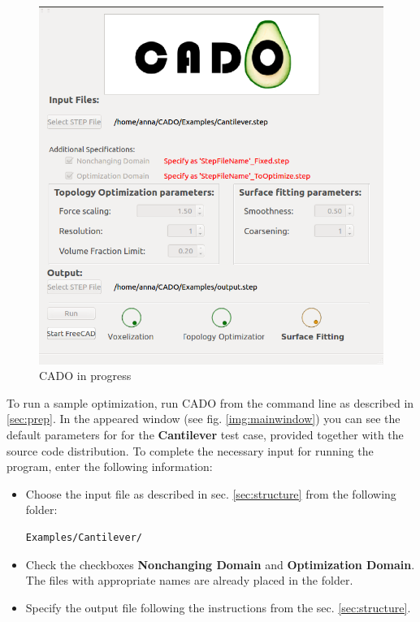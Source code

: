 \documentclass[
12pt, %
a4paper, %
oneside, %
headinclude,footinclude, %
BCOR5mm, %
]{scrartcl}
\begin{document}
\begin{figure}
\centering
\includegraphics[scale=0.4]{Pictures/CADO_inProgress}
\caption{CADO in progress}
\label{fig:inProgress}
\end{figure}
To run a sample optimization, run CADO from the command line as described in \ref{sec:prep}. In the appeared window (see fig. \ref{img:mainwindow}) you can see the default parameters for for the \textbf{Cantilever} test case, provided together with the source code distribution. To complete the necessary input for running the program, enter the following information:
\begin{itemize}
\item Choose the input file as described in sec. \ref{sec:structure} from the following folder:
\begin{lstlisting}[language = {Promela}]
Examples/Cantilever/
\end{lstlisting}
\item Check the checkboxes \textbf{Nonchanging Domain} and \textbf{Optimization Domain}. The files with appropriate names are already placed in the folder.
\item Specify the output file following the instructions from the sec. \ref{sec:structure}.
\end{itemize}
\end{document}
